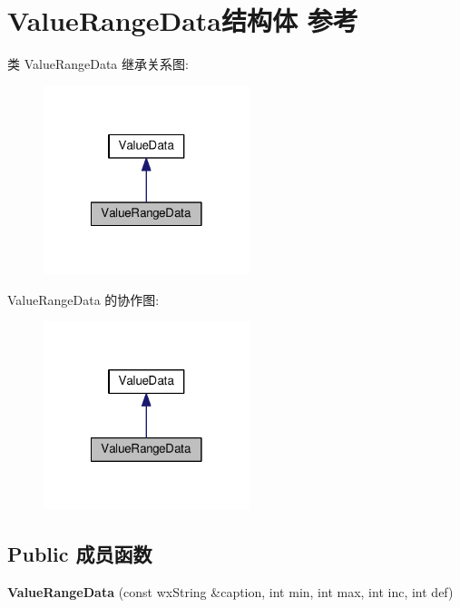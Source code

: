 \hypertarget{struct_value_range_data}{\section{Value\+Range\+Data结构体 参考}
\label{struct_value_range_data}
}


类 Value\+Range\+Data 继承关系图\+:
\nopagebreak
\begin{figure}[H]
\begin{center}
\leavevmode
\includegraphics[width=170pt]{struct_value_range_data__inherit__graph}
\end{center}
\end{figure}


Value\+Range\+Data 的协作图\+:
\nopagebreak
\begin{figure}[H]
\begin{center}
\leavevmode
\includegraphics[width=170pt]{struct_value_range_data__coll__graph}
\end{center}
\end{figure}
\subsection*{Public 成员函数}
\begin{DoxyCompactItemize}
\item 
\hypertarget{struct_value_range_data_a0869a1fbf360000d61d30ad6f5fee58a}{{\bfseries Value\+Range\+Data} (const wx\+String \&caption, int min, int max, int inc, int def)}\label{struct_value_range_data_a0869a1fbf360000d61d30ad6f5fee58a}

\end{DoxyCompactItemize}

